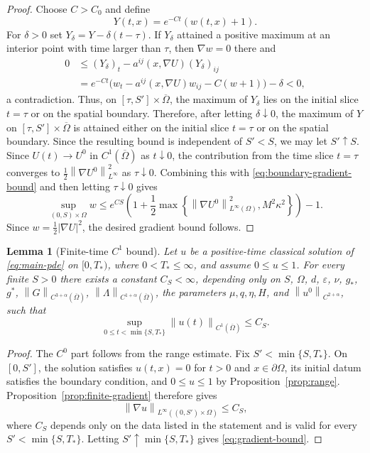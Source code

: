 \documentclass[11pt]{article}
\newtheorem{lemma}[theorem]{Lemma}
\theoremstyle{remark}
\newcommand{\eps}{\varepsilon}
\newcommand{\nupar}{\nu}
\newcommand{\norm}[1]{\left\lVert #1\right\rVert}
\begin{document}
\begin{proof}
Choose $C>C_0$ and define
\[
        Y(t,x)=e^{-Ct}(w(t,x)+1).
\]
For $\delta>0$ set $Y_\delta=Y-\delta(t-\tau)$.  If $Y_\delta$ attained a positive maximum at an interior point with time larger than $\tau$, then $\nabla w=0$ there and
\[
\begin{aligned}
        0&\le (Y_\delta)_t-a^{ij}(x,\nabla U)(Y_\delta)_{ij}\\
        &=e^{-Ct}\bigl(w_t-a^{ij}(x,\nabla U)w_{ij}-C(w+1)\bigr)-\delta<0,
\end{aligned}
\]
a contradiction.  Thus, on $[\tau,S']\times\overline\Omega$, the maximum of $Y_\delta$
lies on the initial slice $t=\tau$ or on the spatial boundary.  Therefore, after letting $\delta\downarrow0$, the maximum of $Y$ on
$[\tau,S']\times\overline{\Omega}$ is attained either on the initial
slice $t=\tau$ or on the spatial boundary.
Since the resulting bound is independent of $S'<S$, we may let $S'\uparrow S$.  Since $U(t)\to U^0$ in $C^1(\overline\Omega)$ as $t\downarrow0$, the contribution from the time slice $t=\tau$ converges to $\frac12\norm{\nabla U^0}_{L^\infty}^2$ as $\tau\downarrow0$.  Combining this with \eqref{eq:boundary-gradient-bound} and then letting $\tau\downarrow0$ gives
\[
        \sup_{(0,S)\times\Omega}w
        \le
        e^{CS}\left(1+\frac12\max\left\{
        \norm{\nabla U^0}_{L^\infty(\Omega)}^2,
        M^2\kappa^2
        \right\}\right)-1.
\]
Since \(w=\frac12|\nabla U|^2\), the desired gradient bound follows.
\end{proof}

\begin{lemma}[Finite-time $C^1$ bound]\label{lem:gradient}
Let $u$ be a positive-time classical solution of \eqref{eq:main-pde} on $[0,T_*)$, where $0<T_*\le\infty$, and assume $0\le u\le1$.  For every finite $S>0$ there exists a constant $C_S<\infty$, depending only on $S$, $\Omega$, $d$, $\eps$, $\nupar$, $g_*$, $g^*$, $\norm{G}_{C^{3+\alpha}(\overline\Omega)}$, $\norm{\Lambda}_{C^{1+\alpha}(\overline\Omega)}$, the parameters $\mu,q,\eta,H$, and $\norm{u^0}_{C^{2+\alpha}}$, such that
\begin{equation}\label{eq:gradient-bound}
        \sup_{0\le t<\min\{S,T_*\}}\norm{u(t)}_{C^1(\overline\Omega)}\le C_S.
\end{equation}
\end{lemma}

\begin{proof}
The \(C^0\) part follows from the range estimate. Fix
\(S'<\min\{S,T_*\}\). On \([0,S']\), the solution satisfies
\(u(t,x)=0\) for \(t>0\) and \(x\in\partial\Omega\), its initial datum
satisfies the boundary condition, and \(0\leq u\leq1\) by
Proposition~\ref{prop:range}. Proposition~\ref{prop:finite-gradient}
therefore gives
\[
\norm{\nabla u}_{L^\infty((0,S')\times\Omega)}\leq C_S,
\]
where \(C_S\) depends only on the data listed in the statement and is
valid for every \(S'<\min\{S,T_*\}\). Letting
\(S'\uparrow\min\{S,T_*\}\) gives \eqref{eq:gradient-bound}.
\end{proof}
\end{document}
